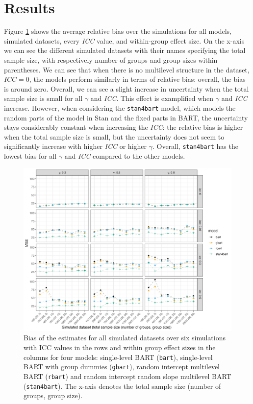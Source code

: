 \documentclass[10pt, a4paper, titlepage]{article}
\begin{document}
\section{Results}
\graphicspath{{./graphs/}}
Figure \ref{fig:biasplots} shows the average relative bias over the simulations for all models, simulated datasets, every \textit{ICC} value, and within-group effect size. On the x-axis we can see the different simulated datasets with their names specifying the total sample size, with respectively number of groups and group sizes within parentheses. We can see that when there is no multilevel structure in the dataset, $ICC = 0$, the models perform similarly in terms of relative bias: overall, the bias is around zero. Overall, we can see a slight increase in uncertainty when the total sample size is small for all $\gamma$ and \textit{ICC}. This effect is examplified when $\gamma$ and \textit{ICC} increase. However, when considering the \texttt{stan4bart} model, which models the random parts of the model in Stan and the fixed parts in BART, the uncertainty stays considerably constant when increasing the \textit{ICC}: the relative bias is higher when the total sample size is small, but the uncertainty does not seem to significantly increase with higher \textit{ICC} or higher $\gamma$. Overall, \texttt{stan4bart} has the lowest bias for all $\gamma$ and \textit{ICC} compared to the other models.

\begin{figure}[H]
\caption{Bias of the estimates for all simulated datasets over six simulations with ICC values in the rows and within group effect sizes in the columns for four models: single-level BART (\texttt{bart}), single-level BART with group dummies (\texttt{gbart}), random intercept multilevel BART (\texttt{rbart}) and random intercept random slope multilevel BART (\texttt{stan4bart}). The x-axis denotes the total sample size (number of groups, group size).}
\centering
\label{fig:biasplots}
\includegraphics[width=\textwidth]{biasplot.png}
\end{figure}
\end{document}
